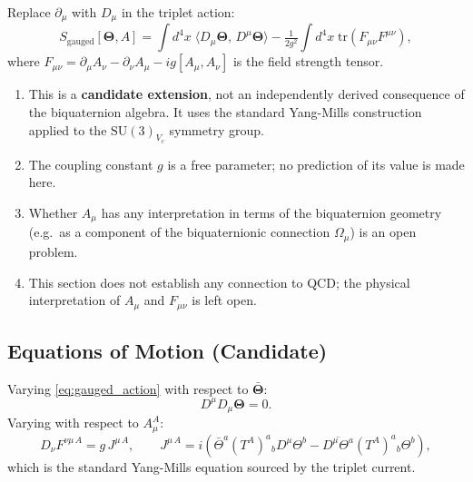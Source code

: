 \begin{definition}
  \label{def:gauged_action}
  Replace $\partial_\mu$ with $D_\mu$ in the triplet action:
  \begin{equation}
    \label{eq:gauged_action}
    S_\mathrm{gauged}[\boldsymbol{\Theta},A]
    = \int d^4x\;
    \langle D_\mu\boldsymbol{\Theta},\,D^\mu\boldsymbol{\Theta}\rangle
    - \tfrac{1}{2g^2}\int d^4x\;\mathrm{tr}(F_{\mu\nu}F^{\mu\nu}),
  \end{equation}
  where
  $F_{\mu\nu} = \partial_\mu A_\nu - \partial_\nu A_\mu
  - ig[A_\mu,A_\nu]$
  is the field strength tensor.
\end{definition}

\begin{remark}
  \label{rem:local_gauge_status}
  \begin{enumerate}
    \item This is a \textbf{candidate extension}, not an independently derived
      consequence of the biquaternion algebra.  It uses the standard
      Yang-Mills construction applied to the $\mathrm{SU}(3)_{V_c}$ symmetry
      group.
    \item The coupling constant $g$ is a free parameter; no prediction of its
      value is made here.
    \item Whether $A_\mu$ has any interpretation in terms of the biquaternion
      geometry (e.g.\ as a component of the biquaternionic connection
      $\Omega_\mu$) is an open problem.
    \item This section does not establish any connection to QCD; the physical
      interpretation of $A_\mu$ and $F_{\mu\nu}$ is left open.
  \end{enumerate}
\end{remark}

\subsection{Equations of Motion (Candidate)}

Varying \eqref{eq:gauged_action} with respect to $\bar{\boldsymbol{\Theta}}$:
\begin{equation}
  D^\mu D_\mu\boldsymbol{\Theta} = 0.
\end{equation}
Varying with respect to $A_\mu^A$:
\begin{equation}
  D_\nu F^{\nu\mu\,A} = g\,J^{\mu\,A},
  \qquad
  J^{\mu\,A}
  = i\!\left(
      \bar\Theta^a(T^A)^a{}_b D^\mu\Theta^b
      - \overline{D^\mu\Theta^a}(T^A)^a{}_b\Theta^b
    \right),
\end{equation}
which is the standard Yang-Mills equation sourced by the triplet current.

